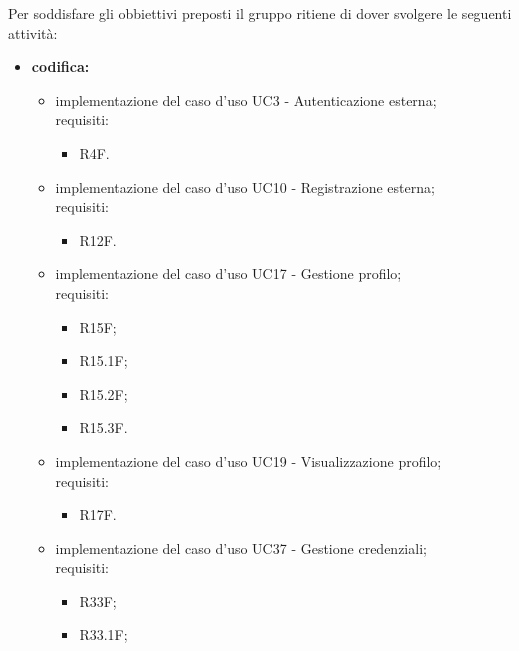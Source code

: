Per soddisfare gli obbiettivi preposti il gruppo ritiene di dover svolgere le seguenti attività:
\begin{itemize}
    \item \textbf{codifica:}
          \begin{itemize}
              \item implementazione del caso d'uso UC3 - Autenticazione esterna;\\
                    requisiti:
                    \begin{itemize}
                        \item R4F.
                    \end{itemize}
              \item implementazione del caso d'uso UC10 - Registrazione esterna;\\
                    requisiti:
                    \begin{itemize}
                        \item R12F.
                    \end{itemize}
              \item implementazione del caso d'uso UC17 - Gestione profilo;\\
                    requisiti:
                    \begin{itemize}
                        \item R15F;
                        \item R15.1F;
                        \item R15.2F;
                        \item R15.3F.
                    \end{itemize}
              \item implementazione del caso d'uso UC19 - Visualizzazione profilo;\\
                    requisiti:
                    \begin{itemize}
                        \item R17F.
                    \end{itemize}
              \item implementazione del caso d'uso UC37 - Gestione credenziali;\\
                    requisiti:
                    \begin{itemize}
                        \item R33F;
                        \item R33.1F;

\end{itemize}
\end{itemize}
\end{itemize}
